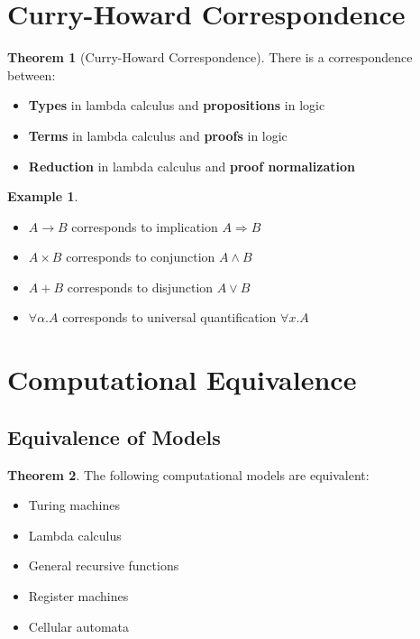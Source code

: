 \documentclass[11pt]{article}
\theoremstyle{definition}
\newtheorem{theorem}{Theorem}[section]
\newtheorem{example}{Example}[section]
\begin{document}
\section{Curry-Howard Correspondence}

\begin{theorem}[Curry-Howard Correspondence]
There is a correspondence between:
\begin{itemize}
    \item \textbf{Types} in lambda calculus and \textbf{propositions} in logic
    \item \textbf{Terms} in lambda calculus and \textbf{proofs} in logic
    \item \textbf{Reduction} in lambda calculus and \textbf{proof normalization}
\end{itemize}
\end{theorem}

\begin{example}
\begin{itemize}
    \item $A \to B$ corresponds to implication $A \Rightarrow B$
    \item $A \times B$ corresponds to conjunction $A \land B$
    \item $A + B$ corresponds to disjunction $A \lor B$
    \item $\forall \alpha. A$ corresponds to universal quantification $\forall x. A$
\end{itemize}
\end{example}

\section{Computational Equivalence}

\subsection{Equivalence of Models}
\begin{theorem}
The following computational models are equivalent:
\begin{itemize}
    \item Turing machines
    \item Lambda calculus
    \item General recursive functions
    \item Register machines
    \item Cellular automata
\end{itemize}
\end{theorem}
\end{document}
